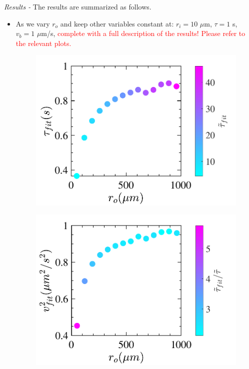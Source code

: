 \documentclass[%
10pt,
superscriptaddress,
twocolumn,
 amsmath,amssymb,
 aps,prx,
]{revtex4-2}
\begin{document}
\textit{Results - }The results are summarized as follows.
\begin{itemize}
  \item As we vary $r_o$ and keep other variables constant at: $r_i = 10$ $\mu$m, $\tau =1$ s, $v_b =1$ $\mu$m/s, \textcolor{red}{complete with a full description of the results! Please refer to the relevant plots.}

\begin{figure}[h!]
  \centering
  \includegraphics[width=\columnwidth]{ro_t1fit_t2fit}
  \caption{}
  \label{fig:MSD_different_ro}
\end{figure}
\begin{figure}[h!]
  \includegraphics[width=\columnwidth]{ro_v2fit_t2fit}
  \caption{}
  \label{fig:v2_ro}
\end{figure}



\end{itemize}
\end{document}
